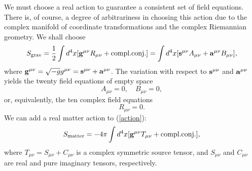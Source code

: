 \documentclass[a4paper,10pt]{article}
\begin{document}
We must choose a real action to guarantee a consistent set of field
equations. There is, of course, a degree of arbitrariness in choosing this
action due to the complex manifold of coordinate transformations and the
complex Riemannian geometry. We shall choose~\cite{Moffat2}
\begin{equation}
\label{action}
S_{\rm grav}=\frac{1}{2}\int d^4x[{\bf g}^{\mu\nu}R_{\mu\nu}+{\rm
compl. conj.}]=\int d^4x[{\bf s}^{\mu\nu}A_{\mu\nu}
+{\bf a}^{\mu\nu}B_{\mu\nu}],
\end{equation}
where ${\bf g}^{\mu\nu}=\sqrt{-g}g^{\mu\nu}={\bf s}^{\mu\nu}+{\bf
a}^{\mu\nu}$. The variation with respect to ${\bf s}^{\mu\nu}$ and ${\bf
a}^{\mu\nu}$ yields the twenty field equations of empty space
\begin{equation}
A_{\mu\nu}=0,\quad B_{\mu\nu}=0,
\end{equation}
or, equivalently, the ten complex field equations
\begin{equation}
\label{fieldequations}
R_{\mu\nu}=0.
\end{equation}
We can add a real matter action to (\ref{action}):
\begin{equation}
S_{\rm matter}=-4\pi\int d^4x[{\bf g}^{\mu\nu}T_{\mu\nu}+{\rm compl.
conj.}],
\end{equation}
where $T_{\mu\nu}=S_{\mu\nu}+C_{\mu\nu}$ is a complex symmetric
source tensor, and $S_{\mu\nu}$ and $C_{\mu\nu}$ are real and pure
imaginary tensors, respectively.
\end{document}
